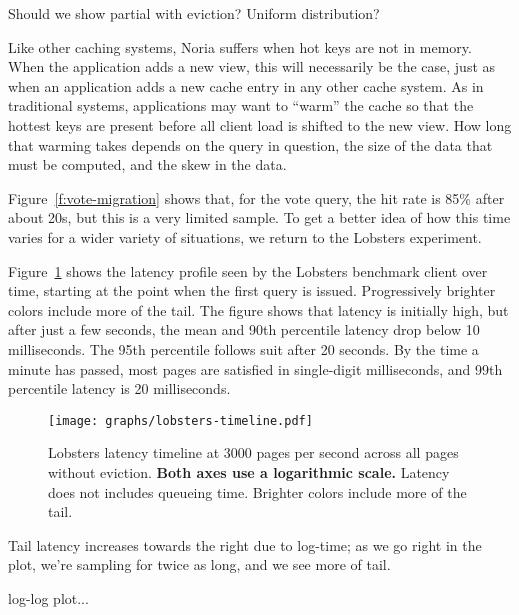 \begin{inprogress}
  Should we show partial with eviction?
  Uniform distribution?
\end{inprogress}

Like other caching systems, Noria suffers when hot keys are not in memory. When
the application adds a new view, this will necessarily be the case, just as when
an application adds a new cache entry in any other cache system. As in
traditional systems, applications may want to ``warm'' the cache so that the
hottest keys are present before all client load is shifted to the new view. How
long that warming takes depends on the query in question, the size of the data
that must be computed, and the skew in the data.

Figure~\ref{f:vote-migration} shows that, for the vote query, the hit rate is
85\% after about 20s, but this is a very limited sample. To get a better idea of
how this time varies for a wider variety of situations, we return to the
Lobsters experiment.

Figure~\ref{f:lobsters-timeline} shows the latency profile seen by the Lobsters
benchmark client over time, starting at the point when the first query is
issued. Progressively brighter colors include more of the tail. The figure
shows that latency is initially high, but after just a few seconds, the mean and
90th percentile latency drop below 10 milliseconds. The 95th percentile follows
suit after 20 seconds. By the time a minute has passed, most pages are satisfied
in single-digit milliseconds, and 99th percentile latency is 20 milliseconds.

\begin{figure}[t]
  \centering
  \texttt{[image: graphs/lobsters-timeline.pdf]}
  \caption{Lobsters latency timeline at 3000 pages per second across all pages
  without eviction. \textbf{Both axes use a logarithmic scale.} Latency does not
  includes queueing time. Brighter colors include more of the tail.}
  \label{f:lobsters-timeline}
\end{figure}

\begin{inprogress}
  Tail latency increases towards the right due to log-time; as we go right in
  the plot, we're sampling for twice as long, and we see more of tail.
\end{inprogress}

\begin{inprogress}
  log-log plot...
\end{inprogress}

